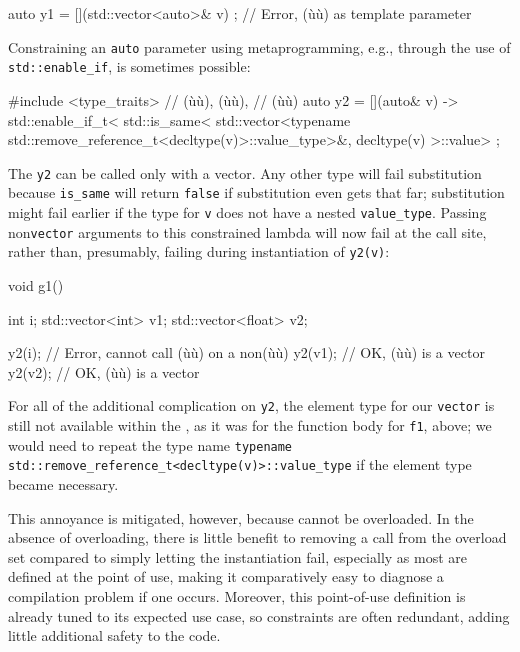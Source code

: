 {\begin{emcppslisting}[emcppsbatch=e8]
auto y1 = [](std::vector<auto>& v) { };  // Error, (ù{}ù) as template parameter
\end{emcppslisting}
    

\noindent Constraining an \lstinline!auto! parameter using metaprogramming, e.g.,
through the use of \lstinline!std::enable_if!, is sometimes possible:

\begin{emcppslisting}[emcppsbatch=e8]
#include <type_traits>  // (ù{}ù), (ù{}ù),
                        // (ù{}ù)
auto y2 = [](auto& v) -> std::enable_if_t<
    std::is_same<
        std::vector<typename std::remove_reference_t<decltype(v)>::value_type>&,
        decltype(v)
    >::value> { };
\end{emcppslisting}
    

\noindent The \lstinline!y2!  can be called only with a vector. Any
other type will fail substitution because \lstinline!is_same! will return
\lstinline!false! if substitution even gets that far; substitution might
fail earlier if the type for \lstinline!v! does not have a nested
\lstinline!value_type!. Passing non\lstinline!vector! arguments to this
constrained lambda will now fail at the call site, rather than,
presumably, failing during instantiation of \lstinline!y2(v)!:

\begin{emcppslisting}[emcppsbatch=e8]
void g1()
{
    int                i;
    std::vector<int>   v1;
    std::vector<float> v2;

    y2(i);   // Error, cannot call (ù{}ù) on a non(ù{}ù)
    y2(v1);  // OK, (ù{}ù) is a vector
    y2(v2);  // OK, (ù{}ù) is a vector
}
\end{emcppslisting}
    

\noindent For all of the additional complication on \lstinline!y2!, the element type
for our \lstinline!vector! is still not available within the , as it was for the function body for \lstinline!f1!, above; we would
need to repeat the type name \lstinline!typename!
\lstinline!std::remove_reference_t<decltype(v)>::value_type! if the
element type became necessary.

This annoyance is mitigated, however, because  cannot be overloaded. In the absence of overloading, there
is little benefit to removing a call from the overload set compared to
simply letting the instantiation fail, especially as most  are defined at the point of use, making it comparatively
easy to diagnose a compilation problem if one occurs. Moreover, this
point-of-use definition is already tuned to its expected use case, so
constraints are often redundant, adding little additional safety to the
code.

}
